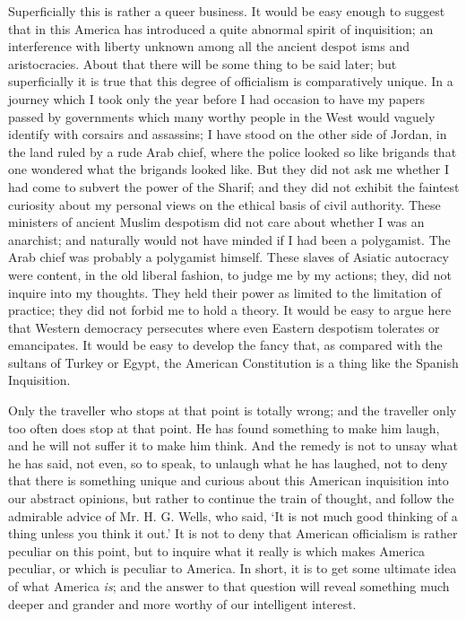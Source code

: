 \documentclass{book}
\begin{document}
Superficially this is rather a queer business. It would be easy enough to suggest that in this America has introduced a quite abnormal spirit of inquisition; an interference with liberty unknown among all the ancient despot isms and aristocracies. About that there will be some thing to be said later; but superficially it is true that this degree of officialism is comparatively unique. In a journey which I took only the year before I had occasion to have my papers passed by governments which many worthy people in the West would vaguely identify with corsairs and assassins; I have stood on the other side of Jordan, in the land ruled by a rude Arab chief, where the police looked so like brigands that one wondered what the brigands looked like. But they did not ask me whether I had come to subvert the power of the Sharif; and they did not exhibit the faintest curiosity about my personal views on the ethical basis of civil authority. These ministers of ancient Muslim despotism did not care about whether I was an anarchist; and naturally would not have minded if I had been a polygamist. The Arab chief was probably a polygamist himself. These slaves of Asiatic autocracy were content, in the old liberal fashion, to judge me by my actions; they, did not inquire into my thoughts. They held their power as limited to the limitation of practice; they did not forbid me to hold a theory. It would be easy to argue here that Western democracy persecutes where even Eastern despotism tolerates or emancipates. It would be easy to develop the fancy that, as compared with the sultans of Turkey or Egypt, the American Constitution is a thing like the Spanish Inquisition.

Only the traveller who stops at that point is totally wrong; and the traveller only too often does stop at that point. He has found something to make him laugh, and he will not suffer it to make him think. And the remedy is not to unsay what he has said, not even, so to speak, to unlaugh what he has laughed, not to deny that there is something unique and curious about this American inquisition into our abstract opinions, but rather to continue the train of thought, and follow the admirable advice of Mr. H. G. Wells, who said, ‘It is not much good thinking of a thing unless you think it out.’ It is not to deny that American officialism is rather peculiar on this point, but to inquire what it really is which makes America peculiar, or which is peculiar to America. In short, it is to get some ultimate idea of what America \emph{is}; and the answer to that question will reveal something much deeper and grander and more worthy of our intelligent interest.
\end{document}
